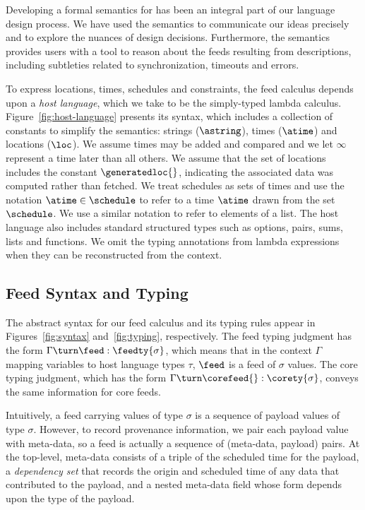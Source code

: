 
Developing a formal semantics for \padsd{} has been an integral part
of our language design process.  We have used the semantics to
communicate our ideas precisely and to explore the nuances of design
decisions. Furthermore, the semantics provides users with a tool to
reason about the feeds resulting from \padsd{} descriptions, including
subtleties related to synchronization, timeouts and errors.

To express locations, times, schedules and constraints, the feed calculus
depends upon a {\em host language}, which we take to be the
simply-typed lambda calculus.  Figure~\ref{fig:host-language} presents
its syntax, which includes a collection of constants to simplify the
semantics: strings ($\astring$), times ($\atime$) and locations
($\loc$).  We assume times may be added and 
compared and we let $\infty$ represent a time later than all others.
We assume that the set of locations includes the constant
$\generatedloc{}$, indicating the associated data was computed rather
than fetched.
We treat schedules as sets of times and use the notation $\atime
\in \schedule$ to refer to a time $\atime$ drawn from the set
$\schedule$.  We use a similar notation to refer to elements of a
list.  The host language also includes standard structured types such as
options, pairs, sums, lists and functions.
We omit the typing annotations from lambda expressions when they can
be reconstructed from the context.


\subsection{Feed Syntax and Typing}
The abstract syntax for our feed calculus and its typing rules appear
in Figures~\ref{fig:syntax} and~\ref{fig:typing}, respectively.  
The feed typing judgment has the form 
$\Gamma \turn \feed : \feedty{\sigma}$, 
which means that in the context $\Gamma$ mapping variables to host
language types $\tau$, $\feed$ is a feed of $\sigma$ values. 
The core typing judgment, which has the form 
$\Gamma \turn \corefeed{} : \corety{\sigma}$, conveys the same
information for core feeds.

Intuitively, a feed carrying values of type $\sigma$ is a sequence of
payload values of type $\sigma$.  However, to record provenance
information, we pair each payload value with meta-data, so a feed is
actually a sequence of (meta-data, payload) pairs.  At the top-level,
meta-data consists of a triple of the scheduled time for the payload,
a \textit{dependency set} that records the origin and scheduled time of any data
that contributed to the payload, and a nested meta-data field whose
form depends upon the type of the payload.

